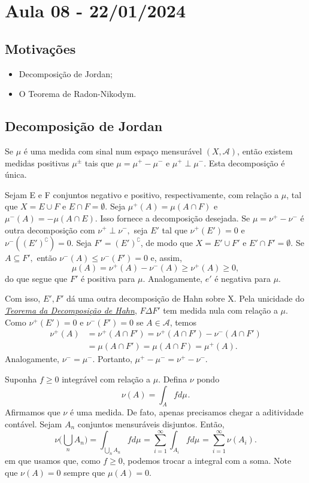 \documentclass[MeasureTheory/measure_theory.tex]{subfiles}
\begin{document}
\section{Aula 08 - 22/01/2024}
\subsection{Motivações}
\begin{itemize}
	\item Decomposição de Jordan;
	\item O Teorema de Radon-Nikodym.
\end{itemize}
\subsection{Decomposição de Jordan}
\hypertarget{jordan_decomposition}{
	\begin{theorem*}
		Se \(\mu \) é uma medida com sinal num espaço mensurável \((X, \mathcal{A})\), então existem medidas positivas \(\mu ^{\pm}\) tais que \(\mu = \mu ^{+} - \mu ^{-}\) e \(\mu ^{+}\perp \mu ^{-}.\) Esta decomposição é única.
	\end{theorem*}}
\begin{proof*}
	Sejam E e F conjuntos negativo e positivo, respectivamente, com relação a \(\mu \), tal que \(X = E\cup F\) e \(E\cap F = \emptyset \). Seja \(\mu ^{+}(A) = \mu (A\cap F)\) e \(\mu ^{-}(A)=-\mu (A\cap E).\) Isso
	fornece a decomposição desejada. Se \(\mu = \nu^{+}-\nu^{-}\) é outra decomposição com \(\nu^{+}\perp \nu^{-},\) seja \(E'\) tal que \(\nu^{+}(E') = 0\) e
	\(\nu^{-}((E')^{\complement}) = 0.\) Seja \(F'=(E')^{\complement}\), de modo que \(X = E' \cup F'\) e \(E'\cap F' = \emptyset \). Se \(A\subseteq F',\) então \(\nu^{-}(A)\leq \nu^{-}(F') = 0\) e, assim,
	\[
		\mu (A) = \nu ^{+}(A) - \nu ^{-}(A) \geq \nu ^{+}(A) \geq 0,
	\]
	do que segue que \(F'\) é positiva para \(\mu \). Analogamente, \(e'\) é negativa para \(\mu .\)

	Com isso, \(E', F'\) dá uma outra decomposição de Hahn sobre X. Pela unicidade do \hyperlink{hahn}{\textit{Teorema da Decomposição de Hahn}}, \(F\Delta F'\) tem medida nula com relação a \(\mu \). Como \(\nu ^{+}(E') = 0\) e \(\nu^{-}(F') = 0\)
	se \(A\in \mathcal{A}\), temos
	\begin{align*}
		\nu ^{+}(A) & = \nu ^{+}(A\cap F') = \nu ^{+}(A\cap F') - \nu ^{-}(A\cap F') \\
		            & = \mu (A\cap F') = \mu (A\cap F) = \mu ^{+}(A).
	\end{align*}
	Analogamente, \(\nu^{-}=\mu ^{-}.\) Portanto, \(\mu^{+}-\mu ^{-}= \nu^{+}-\nu ^{-}. \) \qedsymbol
\end{proof*}
Suponha \(f\geq 0\) integrável com relação a \(\mu \). Defina \(\nu \) pondo
\[
	\nu (A) = \int_{A}f d\mu_{}.
\]
Afirmamos que \(\nu \) é uma medida. De fato, apenas precisamos chegar a aditividade contável. Sejam \(A_{n}\) conjuntos mensuráveis disjuntos. Então,
\[
	\nu \biggl(\bigcup_{n}^{}A_{n}\biggr) = \int_{\bigcup_{n}^{}A_{n}}f d\mu_{} = \sum\limits_{i=1}^{\infty}\int_{A_{i}}f d\mu_{} = \sum\limits_{i=1}^{\infty}\nu (A_{i}).
\]
em que usamos que, como \(f\geq 0\), podemos trocar a integral com a soma. Note que \(\nu (A) = 0\) sempre que \(\mu (A) = 0\).
\end{document}
